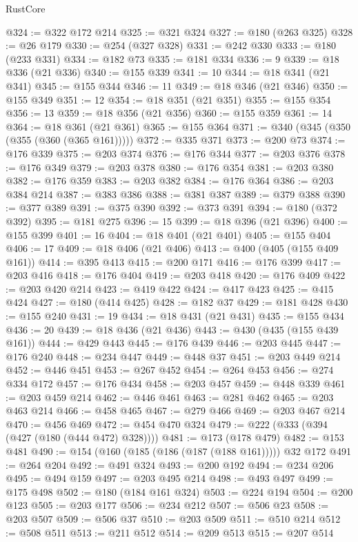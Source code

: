 \begin{lexlean}{RustCore}
\begin{coremodule}
@324 := @322 @172 @214
@325 := @321 @324
@327 := @180 (@263 @325)
@328 := @26 @179
@330 := @254 (@327 @328)
@331 := @242 @330
@333 := @180 (@233 @331)
@334 := @182 @73
@335 := @181 @334
@336 := 9
@339 := @18 @336 (@21 @336)
@340 := @155 @339
@341 := 10
@344 := @18 @341 (@21 @341)
@345 := @155 @344
@346 := 11
@349 := @18 @346 (@21 @346)
@350 := @155 @349
@351 := 12
@354 := @18 @351 (@21 @351)
@355 := @155 @354
@356 := 13
@359 := @18 @356 (@21 @356)
@360 := @155 @359
@361 := 14
@364 := @18 @361 (@21 @361)
@365 := @155 @364
@371 := @340 (@345 (@350 (@355 (@360 (@365 @161)))))
@372 := @335 @371
@373 := @200 @73
@374 := @176 @339
@375 := @203 @374
@376 := @176 @344
@377 := @203 @376
@378 := @176 @349
@379 := @203 @378
@380 := @176 @354
@381 := @203 @380
@382 := @176 @359
@383 := @203 @382
@384 := @176 @364
@386 := @203 @384 @214
@387 := @383 @386
@388 := @381 @387
@389 := @379 @388
@390 := @377 @389
@391 := @375 @390
@392 := @373 @391
@394 := @180 (@372 @392)
@395 := @181 @275
@396 := 15
@399 := @18 @396 (@21 @396)
@400 := @155 @399
@401 := 16
@404 := @18 @401 (@21 @401)
@405 := @155 @404
@406 := 17
@409 := @18 @406 (@21 @406)
@413 := @400 (@405 (@155 @409 @161))
@414 := @395 @413
@415 := @200 @171
@416 := @176 @399
@417 := @203 @416
@418 := @176 @404
@419 := @203 @418
@420 := @176 @409
@422 := @203 @420 @214
@423 := @419 @422
@424 := @417 @423
@425 := @415 @424
@427 := @180 (@414 @425)
@428 := @182 @37
@429 := @181 @428
@430 := @155 @240
@431 := 19
@434 := @18 @431 (@21 @431)
@435 := @155 @434
@436 := 20
@439 := @18 @436 (@21 @436)
@443 := @430 (@435 (@155 @439 @161))
@444 := @429 @443
@445 := @176 @439
@446 := @203 @445
@447 := @176 @240
@448 := @234 @447
@449 := @448 @37
@451 := @203 @449 @214
@452 := @446 @451
@453 := @267 @452
@454 := @264 @453
@456 := @274 @334 @172
@457 := @176 @434
@458 := @203 @457
@459 := @448 @339
@461 := @203 @459 @214
@462 := @446 @461
@463 := @281 @462
@465 := @203 @463 @214
@466 := @458 @465
@467 := @279 @466
@469 := @203 @467 @214
@470 := @456 @469
@472 := @454 @470 @324
@479 := @222 (@333 (@394 (@427 (@180 (@444 @472) @328))))
@481 := @173 (@178 @479)
@482 := @153 @481
@490 := @154 (@160 (@185 (@186 (@187 (@188 @161))))) @32 @172
@491 := @264 @204
@492 := @491 @324
@493 := @200 @192
@494 := @234 @206
@495 := @494 @159
@497 := @203 @495 @214
@498 := @493 @497
@499 := @175 @498
@502 := @180 (@184 @161 @324)
@503 := @224 @194
@504 := @200 @123
@505 := @203 @177
@506 := @234 @212
@507 := @506 @23
@508 := @203 @507
@509 := @506 @37
@510 := @203 @509
@511 := @510 @214
@512 := @508 @511
@513 := @211 @512
@514 := @209 @513
@515 := @207 @514

\end{coremodule}
\end{lexlean}
